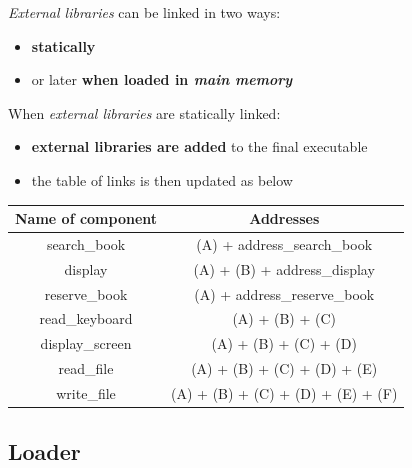 \documentclass{beamer}[10pt, usepdftitle=false, handout]
\begin{document}
	\begin{frame}
	
	\textit{External libraries} can be linked in two ways:
	\vspace*{1em}
	\begin{itemize}
	\item{\textbf{statically}}
	\item{or later \textbf{when loaded in \textit{main memory}}}	
	\end{itemize}		
		
	\vspace*{1em}
	When \textit{external libraries} are statically linked:
	\vspace*{1em}	
	\begin{itemize}
	\item{\textbf{external libraries are added} to the final executable\footnotemark[6]}
	\item{the table of links is then updated as below\footnotemark[7]}
	\end{itemize}	 		
	
	\begin{center}
	\scalebox{0.5} {
	\begin{tabular}{|c|c|}
	\hline
	\textbf{Name of component} & \textbf{Addresses} \\ \hline
	search\_book & (A) + address\_search\_book \\ \hline
	display & (A) + (B) + address\_display \\ \hline
	reserve\_book & (A) + address\_reserve\_book \\ \hline
	read\_keyboard & (A) + (B) + (C) \\ \hline
	display\_screen & (A) + (B) + (C) + (D) \\ \hline
	read\_file & (A) + (B) + (C) + (D) + (E) \\ \hline
	write\_file & (A) + (B) + (C) + (D) + (E) + (F) \\ \hline
	\end{tabular}
	}	
	\end{center}
		
		
	\end{frame}
	
	\subsection{Loader}	
	
\end{document}
